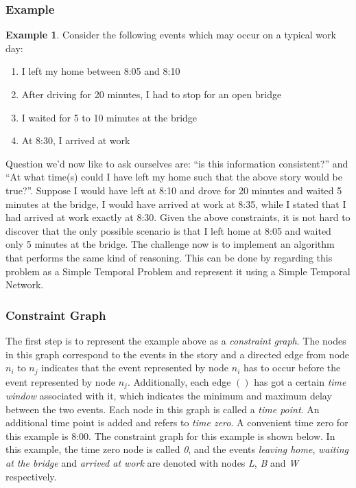 \documentclass{article}
\theoremstyle{definition}
\newtheorem{example}{Example}[section]
\begin{document}
\subsubsection{Example}
\begin{example}
\label{exmp:stn}
Consider the following events which may occur on a typical work day:
\begin{enumerate}
\item I left my home between 8:05 and 8:10
\item After driving for 20 minutes, I had to stop for an open bridge
\item I waited for 5 to 10 minutes at the bridge
\item At 8:30, I arrived at work 
\end{enumerate}
\end{example}

Question we'd now like to ask ourselves are: ``is this information consistent?'' and ``At what time(s) could I have left my home such that the above story would be true?''. 
Suppose I would have left at 8:10 and drove for 20 minutes and waited 5 minutes at the bridge, I would have arrived at work at 8:35, while I stated that I had arrived at work exactly at 8:30. 
Given the above constraints, it is not hard to discover that the only possible scenario is that I left home at 8:05 and waited only 5 minutes at the bridge.
The challenge now is to implement an algorithm that performs the same kind of reasoning. This can be done by regarding this problem as a Simple Temporal Problem and represent it using a Simple Temporal Network.

\subsubsection{Constraint Graph}
The first step is to represent the example above as a \emph{constraint graph}. 
The nodes in this graph correspond to the events in the story and a directed edge from node $n_i$ to $n_j$ indicates that the event represented by node $n_i$ has to occur before the event represented by node $n_j$. Additionally, each edge $()$ has got a certain \emph{time window} associated with it, which indicates the minimum and maximum delay between the two events. 
Each node in this graph is called a \emph{time point}. 
An additional time point is added and refers to \emph{time zero}. 
A convenient time zero for this example is 8:00. 
The constraint graph for this example is shown below. 
In this example, the time zero node is called \emph{0}, and the events \emph{leaving home},  \emph{waiting at the bridge} and \emph{arrived at work} are denoted with nodes \emph{L}, \emph{B} and \emph{W} respectively.
\end{document}
